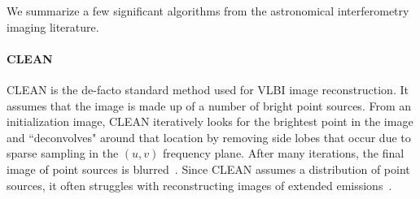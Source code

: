 {%






We summarize a few significant algorithms from the astronomical interferometry imaging literature.




\vspace{-.15in}
\paragraph{CLEAN}

CLEAN is the de-facto standard method used for VLBI image reconstruction. It assumes that the image is made up of a number of bright point sources. From an initialization image, CLEAN iteratively looks for the brightest point in the image and ``deconvolves" around that location by removing side lobes that occur due to sparse sampling in the $(u,v)$ frequency plane. After many iterations, the final image of point sources is blurred~\cite{hogbom1974aperture}. Since CLEAN assumes a distribution of point sources, it often struggles with reconstructing images of extended emissions~\cite{taylor1999synthesis}.


}
